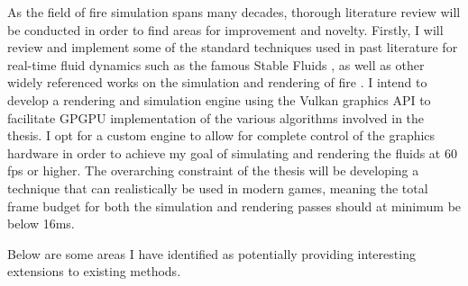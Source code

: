\documentclass[a4paper, 11pt, titlepage]{article}
\begin{document}
As the field of fire simulation spans many decades, thorough literature review
will be conducted in order to find areas for improvement and novelty.
Firstly, I will review and implement some of the standard techniques used
in past literature for 
real-time fluid dynamics such as the famous Stable Fluids \cite{stam}, as well
as other widely referenced works on the simulation and rendering of fire
\cite{nguyen} \cite{gems}. I intend to develop a rendering and simulation
engine using the Vulkan graphics API to facilitate GPGPU implementation of the
various algorithms involved in the thesis. I opt for a custom engine to allow
for complete control of the graphics hardware in order to achieve my goal of
simulating and rendering the fluids at 60 fps or higher. The overarching
constraint of the thesis will be developing a technique that can realistically
be used in modern games, meaning the total frame budget for both the simulation
and rendering passes should at minimum be below 16ms.

\pagebreak
Below are some areas I have identified as potentially providing interesting extensions to
existing methods.
\end{document}
